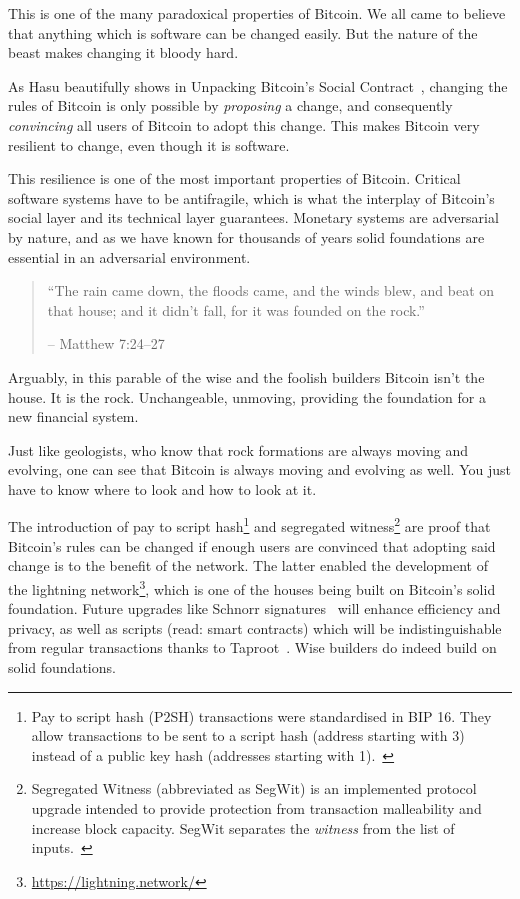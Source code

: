 This is one of the many paradoxical properties of Bitcoin. We all came
to believe that anything which is software can be changed easily. But
the nature of the beast makes changing it bloody hard.

As Hasu beautifully shows in Unpacking Bitcoin's Social
Contract~\cite{social-contract}, changing the rules of Bitcoin is only possible
by \textit{proposing} a change, and consequently \textit{convincing} all users
of Bitcoin to adopt this change. This makes Bitcoin very resilient to change,
even though it is software.

This resilience is one of the most important properties of Bitcoin.
Critical software systems have to be antifragile, which is what the
interplay of Bitcoin's social layer and its technical layer guarantees.
Monetary systems are adversarial by nature, and as we have known for
thousands of years solid foundations are essential in an adversarial
environment.

\begin{quotation}\begin{samepage}
\enquote{The rain came down, the floods came, and the winds blew, and beat on
that house; and it didn't fall, for it was founded on the rock.}
\begin{flushright} -- Matthew 7:24--27
\end{flushright}\end{samepage}\end{quotation}

Arguably, in this parable of the wise and the foolish builders Bitcoin
isn't the house. It is the rock. Unchangeable, unmoving, providing the
foundation for a new financial system.

Just like geologists, who know that rock formations are always moving
and evolving, one can see that Bitcoin is always moving and evolving as
well. You just have to know where to look and how to look at it.

The introduction of pay to script hash\footnote{ Pay to script hash (P2SH)
transactions were standardised in BIP 16. They allow transactions to be sent to
a script hash (address starting with 3) instead of a public key hash (addresses
starting with 1).~\cite{btcwiki:p2sh}} and segregated
witness\footnote{Segregated Witness (abbreviated as SegWit) is an implemented
protocol upgrade intended to provide protection from transaction malleability
and increase block capacity. SegWit separates the \textit{witness} from the list
of inputs.~\cite{btcwiki:segwit}} are proof that Bitcoin's rules can be changed
if enough users are convinced that adopting said change is to the benefit of the
network. The latter enabled the development of the lightning
network\footnote{\url{https://lightning.network/}}, which is one of the houses
being built on Bitcoin's solid foundation. Future upgrades like Schnorr
signatures~\cite{bip:schnorr} will enhance efficiency and privacy, as well as
scripts (read: smart contracts) which will be indistinguishable from regular
transactions thanks to Taproot~\cite{taproot}. Wise builders do indeed build on
solid foundations.

